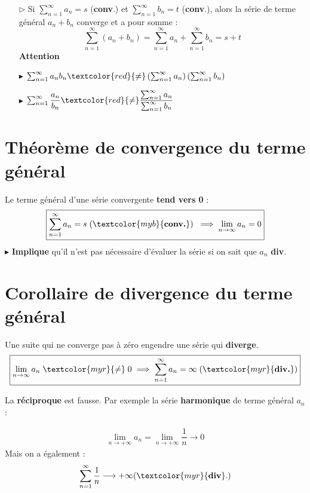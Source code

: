 \documentclass{report}
\begin{document}
\begin{multicols*}{3}
\begin{itemize}
        \item[$\rhd$] Si \(\sum_{n=1}^{\infty} a_n = s\) (\textcolor{myb}{\textbf{conv}}.) et 
            \(\sum_{n=1}^{\infty} b_n = t\) (\textcolor{myb}{\textbf{conv}}.), 
            alors la série de terme général \(a_n + b_n\) 
            converge et a pour somme : 
        \[
        \sum_{n=1}^{\infty} (a_n + b_n) = \sum_{n=1}^{\infty } a_n + \sum_{n=1}^{\infty } b_n = s + t
        \]
        \textcolor{myr}{\textbf{Attention}} 
        \item[$\blacktriangleright$] 
            $\sum_{n=1}^{\infty }a_nb_n \textcolor{red}{\neq} 
            \left(\sum_{n=1}^{\infty }a_n\right) \left(\sum_{n=1}^{\infty}b_n\right)$
        \item[$\blacktriangleright$]
            $\sum_{n=1}^{\infty }\dfrac{a_n}{b_n} 
            \textcolor{red}{\neq} 
            \dfrac{\sum_{n=1}^{\infty }a_n}{\sum_{n=1}^{\infty }b_n}$
    \end{itemize}

    \section{Théorème de convergence du terme général}
        Le terme général d'une série convergente \textbf{tend vers 0} : 
        $$%
        \boxed{\sum_{n=1}^{\infty }a_n = s \; (\textcolor{myb}{\textbf{conv.}}) 
        \;\implies \lim\limits_{n\to \infty} a_n = 0}
        $$%
        $\blacktriangleright$ \textbf{Implique} qu'il n'est pas 
        nécessaire d'évaluer la série si on sait que 
        $a_n$ \textcolor{myr}{\textbf{div}}. 

    \section{Corollaire de divergence du terme général}
    \vspace{-1em}%
        Une suite qui ne converge pas à zéro engendre une série qui \textbf{diverge}.        
        \[%
        \boxed{
        \lim\limits_{n\to \infty} a_n \; \textcolor{myr}{\neq} \; 0 \implies   
        \sum_{n=1}^{\infty }a_n = \infty \; (\textcolor{myr}{\textbf{div.}})}
        \]%
    \vspace{-1em}
    \begin{note}{}{}
        La \textbf{réciproque } est fausse. Par exemple la série 
        \textbf{harmonique} de terme général $a_n$  : 

        \begin{align*}
            \lim\limits_{n \to+\infty }a_n = 
            \lim\limits_{n \to+\infty } \dfrac{1}{n} 
            \longrightarrow 0
        \end{align*}
        Mais on a également  : 
        \begin{align*}
            \sum_{n=1}^{\infty }\dfrac{1}{n} \longrightarrow 
            + \infty (\textcolor{myr}{\textbf{div}}.  )
        \end{align*}
    \end{note}


\end{multicols*}
\end{document}
